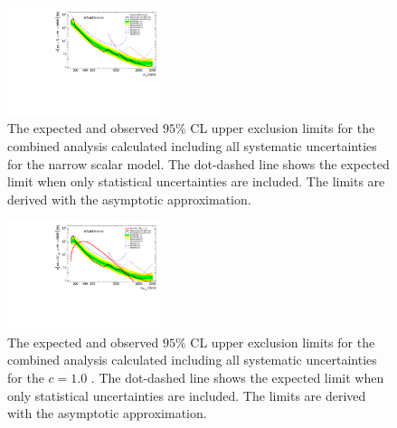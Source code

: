 \begin{figure}
\begin{center}
\includegraphics[width=0.4\textwidth,angle=-90]{figures/boosted/results/BrazilPlot_Asymptotic_s_hh_combined_AllSyst_unblinded_2017-10-04.pdf}
\caption{The expected and observed $95\%$ CL upper exclusion limits for the combined analysis calculated including all systematic uncertainties for the narrow scalar model. The dot-dashed line shows the expected limit when only statistical uncertainties are included. The limits are derived with the asymptotic approximation.}
\label{fig:limit_g10}
\end{center}
\end{figure}

\begin{figure}
\begin{center}
\includegraphics[width=0.4\textwidth,angle=-90]{figures/boosted/results/BrazilPlot_Asymptotic_g_hh_c10_combined_AllSyst_unblinded_2017-10-04.pdf}
\caption{The expected and observed $95\%$ CL upper exclusion limits for the combined analysis calculated including all systematic uncertainties for the $c=1.0$ \Grav. The dot-dashed line shows the expected limit when only statistical uncertainties are included. The limits are derived with the asymptotic approximation.}
\label{fig:limit_g20}
\end{center}
\end{figure}

